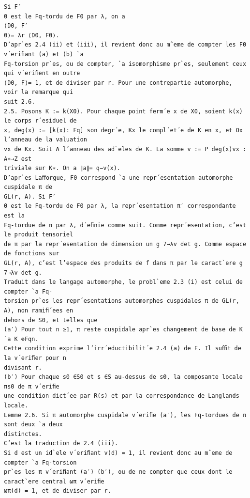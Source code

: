 \documentclass[11pt]{article}
\begin{document}
\begin{Verbatim}[breaklines=true,fontsize=\small]
Si F′
0 est le Fq-tordu de F0 par λ, on a
⟨D0, F′
0⟩= λr ⟨D0, F0⟩.
D’apr`es 2.4 (ii) et (iii), il revient donc au mˆeme de compter les F0 v´eriﬁant (a) et (b) `a
Fq-torsion pr`es, ou de compter, `a isomorphisme pr`es, seulement ceux qui v´eriﬁent en outre
⟨D0, F⟩= 1, et de diviser par r. Pour une contrepartie automorphe, voir la remarque qui
suit 2.6.
2.5. Posons K := k(X0). Pour chaque point ferm´e x de X0, soient k(x) le corps r´esiduel de
x, deg(x) := [k(x): Fq] son degr´e, Kx le compl´et´e de K en x, et Ox l’anneau de la valuation
vx de Kx. Soit A l’anneau des ad`eles de K. La somme v := P deg(x)vx : A∗→Z est
triviale sur K∗. On a ∥a∥= q−v(x).
D’apr`es Laﬀorgue, F0 correspond `a une repr´esentation automorphe cuspidale π de
GL(r, A). Si F′
0 est le Fq-tordu de F0 par λ, la repr´esentation π′ correspondante est la
Fq-tordue de π par λ, d´eﬁnie comme suit. Comme repr´esentation, c’est le produit tensoriel
de π par la repr´esentation de dimension un g 7→λv det g. Comme espace de fonctions sur
GL(r, A), c’est l’espace des produits de f dans π par le caract`ere g 7→λv det g.
Traduit dans le langage automorphe, le probl`eme 2.3 (i) est celui de compter `a Fq-
torsion pr`es les repr´esentations automorphes cuspidales π de GL(r, A), non ramiﬁ´ees en
dehors de S0, et telles que
(a′) Pour tout n ≥1, π reste cuspidale apr`es changement de base de K `a K ⊗Fqn.
Cette condition exprime l’irr´eductibilit´e 2.4 (a) de F. Il suﬃt de la v´eriﬁer pour n
divisant r.
(b′) Pour chaque s0 ∈S0 et s ∈S au-dessus de s0, la composante locale πs0 de π v´eriﬁe
une condition dict´ee par R(s) et par la correspondance de Langlands locale.
Lemme 2.6. Si π automorphe cuspidale v´eriﬁe (a′), les Fq-tordues de π sont deux `a deux
distinctes.
C’est la traduction de 2.4 (iii).
Si d est un id`ele v´eriﬁant v(d) = 1, il revient donc au mˆeme de compter `a Fq-torsion
pr`es les π v´eriﬁant (a′) (b′), ou de ne compter que ceux dont le caract`ere central ωπ v´eriﬁe
ωπ(d) = 1, et de diviser par r.


\end{Verbatim}
\end{document}
